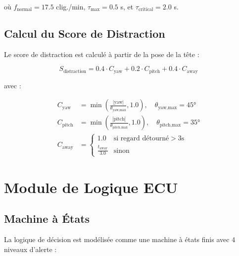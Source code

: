 \documentclass[12pt,a4paper,twoside]{report}
\begin{document}
où $f_{\text{normal}} = 17.5$ clig./min, $\tau_{\text{max}} = 0.5$ s, et $\tau_{\text{critical}} = 2.0$ s.

\subsection{Calcul du Score de Distraction}

Le score de distraction est calculé à partir de la pose de la tête :

\begin{equation}
\boxed{
S_{\text{distraction}} = 0.4 \cdot C_{\text{yaw}} + 0.2 \cdot C_{\text{pitch}} + 0.4 \cdot C_{\text{away}}
}
\label{eq:distraction_score}
\end{equation}

avec :

\begin{align}
C_{\text{yaw}} &= \min\left(\frac{|\text{yaw}|}{\theta_{\text{yaw,max}}}, 1.0\right), \quad \theta_{\text{yaw,max}} = 45° \label{eq:c_yaw} \\
C_{\text{pitch}} &= \min\left(\frac{|\text{pitch}|}{\theta_{\text{pitch,max}}}, 1.0\right), \quad \theta_{\text{pitch,max}} = 35° \label{eq:c_pitch} \\
C_{\text{away}} &= \begin{cases}
    1.0 & \text{si regard détourné} > 3\text{s} \\
    \frac{t_{\text{away}}}{3.0} & \text{sinon}
\end{cases} \label{eq:c_away}
\end{align}

\section{Module de Logique ECU}

\subsection{Machine à États}

La logique de décision est modélisée comme une machine à états finis avec 4 niveaux d'alerte :
\end{document}
